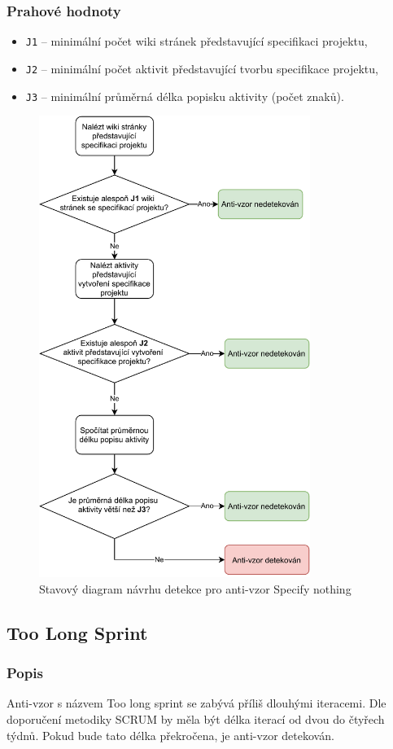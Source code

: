 \documentclass[czech,DP]{thesiskiv}
\begin{document}
\subsubsection{Prahové hodnoty}
\begin{itemize}
    \item \texttt{J1} -- minimální počet wiki stránek představující specifikaci projektu,
    \item \texttt{J2} -- minimální počet aktivit představující tvorbu specifikace projektu,
    \item \texttt{J3} -- minimální průměrná délka popisku aktivity (počet znaků).
\end{itemize}
\begin{figure}[!htb]
    \centering
    \includegraphics[width=250pt]{img/specify_nothing.pdf}
    \caption{Stavový diagram návrhu detekce pro anti-vzor Specify nothing}
    \label{img:specify_nothing}
\end{figure}
\FloatBarrier
\subsection{Too Long Sprint}
\subsubsection{Popis}
Anti-vzor s názvem Too long sprint se zabývá příliš dlouhými iteracemi. Dle doporučení metodiky SCRUM by měla být délka iterací od dvou do čtyřech týdnů. Pokud bude tato délka překročena, je anti-vzor detekován. \cite{scrum_but_anti_patterns}
\end{document}
